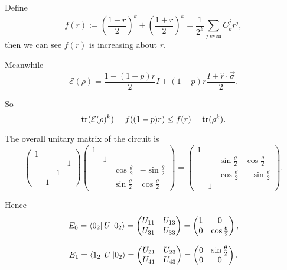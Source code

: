 Define 
$$
    f(r) := \left(\frac{1-r}{2}\right)^k + \left(\frac{1+r}{2}\right)^k
    = \frac{1}{2^k}\sum_{j\text{ even}}C_k^jr^j,
$$
then we can see $f(r)$ is increasing about $r$.

Meanwhile 
$$\mathcal{E}(\rho)=\frac{1-(1-p)r}{2} I + (1-p)r \frac{I+\hat{r}\cdot\vec{\sigma}}{2}.$$

So
$$\operatorname{tr}(\mathcal{E}(\rho)^k) = f((1-p)r) \le f(r) = \operatorname{tr}(\rho^k).$$

\ex \todo

\ex The overall unitary matrix of the circuit is
$$
    \begin{pmatrix}
        1 & & & \\
        & & & 1 \\
        & & 1 & \\
        & 1 & & 
    \end{pmatrix}
    \begin{pmatrix}
        1 & & & \\
        & 1 & & \\
        & & \cos\frac{\theta}{2} & -\sin\frac{\theta}{2} \\
        & & \sin\frac{\theta}{2} & \cos\frac{\theta}{2}
    \end{pmatrix}
    =
    \begin{pmatrix}
        1 & & & \\
        & & \sin\frac{\theta}{2} & \cos\frac{\theta}{2} \\
        & & \cos\frac{\theta}{2} & -\sin\frac{\theta}{2} \\
        & 1 & & 
    \end{pmatrix}.
$$

Hence
$$E_0 = \left\langle0_2\right|U\left|0_2\right\rangle = \begin{pmatrix}
    U_{11} & U_{13} \\
    U_{31} & U_{33}
\end{pmatrix} = \begin{pmatrix}
    1 & 0 \\
    0 & \cos\frac{\theta}{2}
\end{pmatrix},$$

$$E_1 = \left\langle1_2\right|U\left|0_2\right\rangle = \begin{pmatrix}
    U_{21} & U_{23} \\
    U_{41} & U_{43}
\end{pmatrix} = \begin{pmatrix}
    0 & \sin\frac{\theta}{2} \\
    0 & 0
\end{pmatrix}.$$

